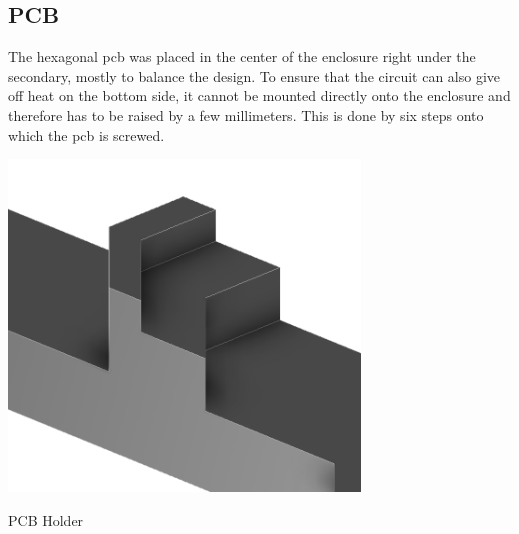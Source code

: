 \subsection{PCB}

The hexagonal \gls{pcb} was placed in the center of the enclosure right under the secondary, mostly to balance the design. To ensure that the circuit can also give off heat on the bottom side, it cannot be mounted directly onto the enclosure and therefore has to be raised by a few millimeters. This is done by six steps onto which the \gls{pcb} is screwed. 

\begin{marginfigure}[-3cm]
    \centering
    \includegraphics[width=0.7\textwidth]{kassandra/resources/JerJerWoBistDuStufe.PNG}
    \caption{PCB Holder}
    \label{fig:bottom_stufe}
\end{marginfigure}
    
